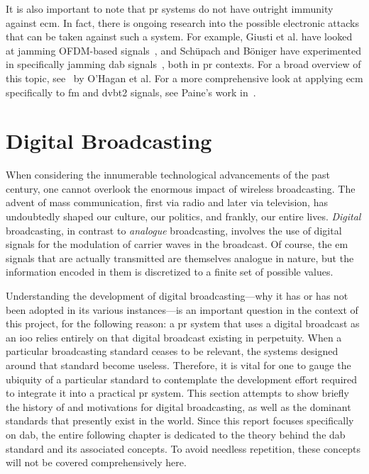 \documentclass[class=report,11pt,crop=false]{standalone}
\begin{document}
It is also important to note that \gls{pr} systems do not have outright immunity against \gls{ecm}. In fact, there is ongoing research into the possible electronic attacks that can be taken against such a system. For example, Giusti et al. have looked at jamming OFDM-based signals~\cite{Giusti2018}, and Sch\"upach and B\"oniger have experimented in specifically jamming \gls{dab} signals~\cite{schupbach2016}, both in \gls{pr} contexts. For a broad overview of this topic, see~\cite{OHagan2019} by O'Hagan et al. For a more comprehensive look at applying \gls{ecm} specifically to \gls{fm} and \gls{dvbt2} signals, see Paine's work in~\cite{painePHD2019}.

\section{Digital Broadcasting}
When considering the innumerable technological advancements of the past century, one cannot overlook the enormous impact of wireless broadcasting. The advent of mass communication, first via radio and later via television, has undoubtedly shaped our culture, our politics, and frankly, our entire lives. \emph{Digital} broadcasting, in contrast to \emph{analogue} broadcasting, involves the use of digital signals for the modulation of carrier waves in the broadcast. Of course, the \gls{em} signals that are actually transmitted are themselves analogue in nature, but the information encoded in them is discretized to a finite set of possible values.

Understanding the development of digital broadcasting---why it has or has not been adopted in its various instances---is an important question in the context of this project, for the following reason: a \gls{pr} system that uses a digital broadcast as an \gls{ioo} relies entirely on that digital broadcast existing in perpetuity. When a particular broadcasting standard ceases to be relevant, the systems designed around that standard become useless. Therefore, it is vital for one to gauge the ubiquity of a particular standard to contemplate the development effort required to integrate it into a practical \gls{pr} system. This section attempts to show briefly the history of and motivations for digital broadcasting, as well as the dominant standards that presently exist in the world. Since this report focuses specifically on \gls{dab}, the entire following chapter is dedicated to the theory behind the \gls{dab} standard and its associated concepts. To avoid needless repetition, these concepts will not be covered comprehensively here.
\end{document}
